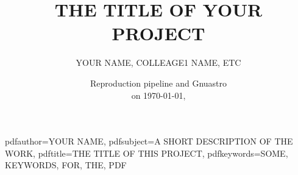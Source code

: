 \usepackage{datetime}





\usepackage[
  colorlinks,
  urlcolor=blue,
  citecolor=blue,
  linkcolor=blue,
  linktocpage]{hyperref}
\renewcommand\UrlFont{\rmfamily}





\renewenvironment{abstract}
 {\vspace{-0.5cm}\small%
  \list{}{%
    \setlength{\leftmargin}{2cm}%
    \setlength{\rightmargin}{\leftmargin}%
  }%
  \item\relax}
 {\endlist}





\newcommand{\includeabstract}[1]{%
\twocolumn[%
  \begin{@twocolumnfalse}%
    \maketitle%
    \begin{abstract}%
    #1%
    \end{abstract}%
    \vspace{1cm}%
  \end{@twocolumnfalse}%
  ]%
}





\hypersetup
{
    pdfauthor={YOUR NAME},
    pdfsubject={A SHORT DESCRIPTION OF THE WORK},
    pdftitle={THE TITLE OF THIS PROJECT},
    pdfkeywords={SOME, KEYWORDS, FOR, THE, PDF}
}





\title{\vspace{-3em}THE TITLE OF YOUR PROJECT}
\author{YOUR NAME, COLLEAGE1 NAME, ETC}
\date{\small Reproduction pipeline \pipelineversion{}
      and Gnuastro \gnuastroversion\\on \today, \currenttime}
